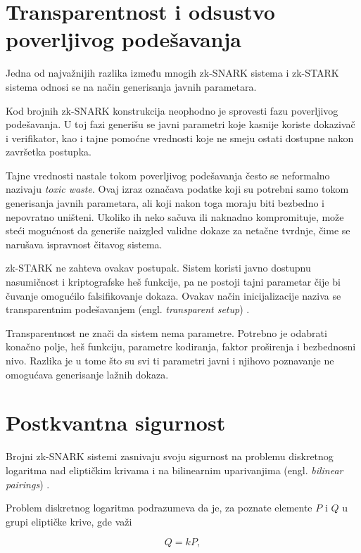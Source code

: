 \section{Transparentnost i odsustvo poverljivog podešavanja}

Jedna od najvažnijih razlika između mnogih zk-SNARK sistema i zk-STARK sistema
odnosi se na način generisanja javnih parametara.

Kod brojnih zk-SNARK konstrukcija neophodno je sprovesti fazu poverljivog
podešavanja. U toj fazi generišu se javni parametri koje kasnije koriste
dokazivač i verifikator, kao i tajne pomoćne vrednosti koje ne smeju ostati
dostupne nakon završetka postupka.

Tajne vrednosti nastale tokom poverljivog podešavanja često se neformalno
nazivaju \textit{toxic waste}. Ovaj izraz označava podatke koji su potrebni samo
tokom generisanja javnih parametara, ali koji nakon toga moraju biti bezbedno i
nepovratno uništeni. Ukoliko ih neko sačuva ili naknadno kompromituje, može
steći mogućnost da generiše naizgled validne dokaze za netačne tvrdnje, čime se
narušava ispravnost čitavog sistema.

zk-STARK ne zahteva ovakav postupak. Sistem koristi javno dostupnu nasumičnost
i kriptografske heš funkcije, pa ne postoji tajni parametar čije bi čuvanje
omogućilo falsifikovanje dokaza. Ovakav način inicijalizacije naziva se
transparentnim podešavanjem (engl. \textit{transparent setup})
\cite{stark2018,ethstark2023}.

Transparentnost ne znači da sistem nema parametre. Potrebno je odabrati
konačno polje, heš funkciju, parametre kodiranja, faktor proširenja i
bezbednosni nivo. Razlika je u tome što su svi ti parametri javni i njihovo
poznavanje ne omogućava generisanje lažnih dokaza.

\section{Postkvantna sigurnost}

Brojni zk-SNARK sistemi zasnivaju svoju sigurnost na problemu diskretnog
logaritma nad eliptičkim krivama i na bilinearnim uparivanjima
(engl. \textit{bilinear pairings}) \cite{nitulescu2023snarks}.

Problem diskretnog logaritma podrazumeva da je, za poznate elemente \(P\) i
\(Q\) u grupi eliptičke krive, gde važi

\begin{equation}
    Q = kP,
\end{equation}

